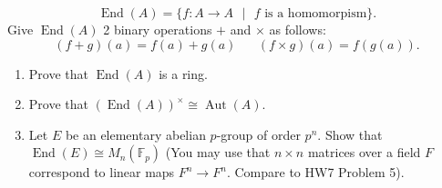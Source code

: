 \documentclass[11pt]{article}
\newcommand{\Aut}{\operatorname{Aut}}
\newcommand{\bF}{\mathbb{F}}
\begin{document}
\begin{enumerate}
{  \[\operatorname{End}(A) = \{f:A\to A\text{ }|\text{ }f\text{ is a homomorpism}\}.\]
  Give $\operatorname{End}(A)$ 2 binary operations $+$ and $\times$ as follows:
  \[(f+g)(a) = f(a)+g(a)\hspace{20pt}(f\times g)(a) = f(g(a)).\]
  \begin{enumerate}
    \item{
    Prove that $\operatorname{End}(A)$ is a ring.
    }
    \item{
    Prove that $(\operatorname{End}(A))^\times\cong\Aut(A)$.
    }
    \item{
    Let $E$ be an elementary abelian $p$-group of order $p^n$.  Show that $\operatorname{End}(E)\cong M_n(\bF_p)$ (You may use that $n\times n$ matrices over a field $F$ correspond to linear maps $F^n\to F^n$.  Compare to HW7 Problem 5).
    }
  \end{enumerate}
  }
\end{enumerate}
\end{document}
